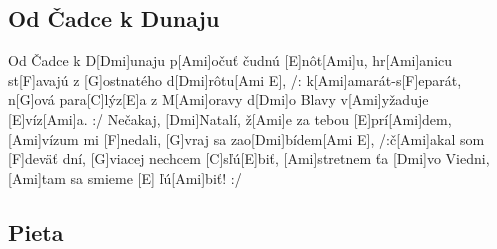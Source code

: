 \documentclass[10pt]{article}
\begin{document}
\begin{Large}
\begin{minipage}{\textwidth}
\subsection{Od Čadce k Dunaju}
\begin{multicols}{2}
\begin{guitar}
	[Ami]Od Čadce k D[Dmi]unaju p[Ami]očuť čudnú [E]nôt[Ami]u,
	hr[Ami]anicu st[F]avajú z [G]ostnatého d[Dmi]rôtu[Ami E],
	/: k[Ami]amarát-s[F]eparát, n[G]ová para[C]lýz[E]a
	z M[Ami]oravy d[Dmi]o Blavy v[Ami]yžaduje [E]víz[Ami]a. :/
	\columnbreak
	[Ami]Nečakaj, [Dmi]Natalí, ž[Ami]e za tebou [E]prí[Ami]dem,
	[Ami]vízum mi [F]nedali, [G]vraj sa zao[Dmi]bídem[Ami E],
	/:č[Ami]akal som [F]deväť dní, [G]viacej nechcem [C]sľú[E]biť,
	[Ami]stretnem ťa [Dmi]vo Viedni, [Ami]tam sa smieme [E] ľú[Ami]biť! :/
\end{guitar}
\end{multicols}
\end{minipage}

\begin{minipage}{\textwidth}
\subsection{Pieta}
\begin{multicols}{2}
\begin{guitar}
	

\end{guitar}
\end{multicols}
\end{minipage}
\end{Large}
\end{document}
